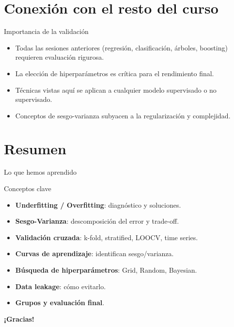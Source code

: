 \documentclass[aspectratio=169, 10pt, xcolor=table]{beamer}
\begin{document}
\section{Conexión con el resto del curso}

\begin{frame}{Importancia de la validación}
    \begin{itemize}
        \item Todas las sesiones anteriores (regresión, clasificación, árboles, boosting) requieren evaluación rigurosa.
        \item La elección de hiperparámetros es crítica para el rendimiento final.
        \item Técnicas vistas aquí se aplican a cualquier modelo supervisado o no supervisado.
        \item Conceptos de sesgo-varianza subyacen a la regularización y complejidad.
    \end{itemize}
\end{frame}

\section{Resumen}

\begin{frame}{Lo que hemos aprendido}
    \begin{exampleblock}{Conceptos clave}
        \begin{itemize}
            \item \textbf{Underfitting / Overfitting}: diagnóstico y soluciones.
            \item \textbf{Sesgo-Varianza}: descomposición del error y trade-off.
            \item \textbf{Validación cruzada}: k-fold, stratified, LOOCV, time series.
            \item \textbf{Curvas de aprendizaje}: identifican sesgo/varianza.
            \item \textbf{Búsqueda de hiperparámetros}: Grid, Random, Bayesian.
            \item \textbf{Data leakage}: cómo evitarlo.
            \item \textbf{Grupos y evaluación final}.
        \end{itemize}
    \end{exampleblock}
\end{frame}

\begin{frame}
    \centering
    \Huge \textbf{¡Gracias!}

\end{frame}
\end{document}
